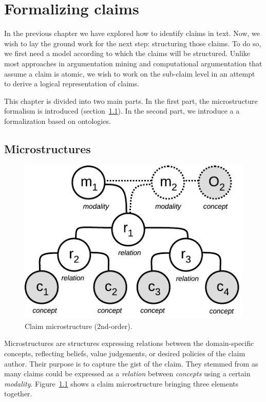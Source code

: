 \chapter{Formalizing claims}
\label{chap:formalization}

In the previous chapter we have explored how to identify claims in text. 
Now, we wish to lay the ground work for the next step: structuring those claims. 
To do so, we first need a model according to which the claims will be structured. 
Unlike most approaches in argumentation mining and computational argumentation that
assume a claim is atomic, we wish to work on the sub-claim level in an attempt to 
derive a logical representation of claims. 

This chapter is divided into two main parts. 
In the first part, the microstructure formalism is introduced 
(section~\ref{sec:for_microstructures}). 
In the second part, we introduce a
a formalization based on ontologies. 

\section{Microstructures}
\label{sec:for_microstructures}

\begin{figure}
	\begin{center}
      \includegraphics[scale=1]{microstructure.pdf}
      \end{center}
      \caption{Claim microstructure (2nd-order).}
  \label{fig:structures_flowchart}
\end{figure}

Microstructures are structures expressing relations between the domain-specific
concepts, reflecting beliefs, value judgements, or desired policies of the claim
author. Their purpose is to capture the gist of the claim. 
They stemmed from as many claims could be expressed as a \emph{relation}
between \emph{concepts} using a certain \emph{modality}. 
Figure~\ref{fig:structures_flowchart} shows a claim microstructure bringing three elements 
together. 

